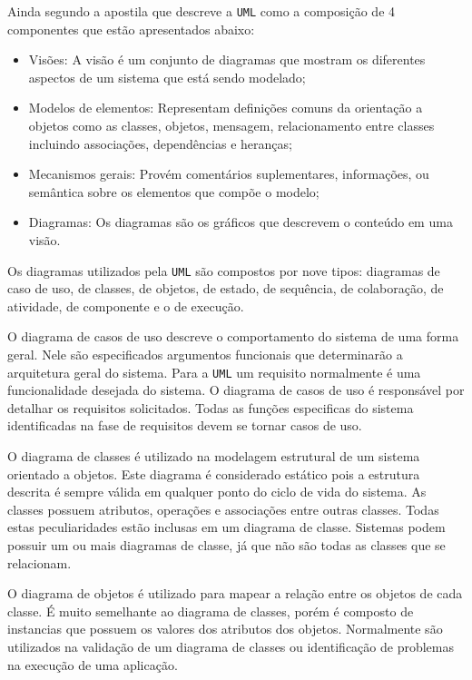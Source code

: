 Ainda segundo a apostila \cite{uml} que descreve a \texttt{UML} como a composição de 4 componentes que estão apresentados abaixo:

\begin{itemize}

	\item Visões: A visão é um conjunto de diagramas que mostram os diferentes aspectos de um sistema que está sendo modelado;
	\item Modelos de elementos: Representam definições comuns da orientação a objetos como as classes, objetos, mensagem, 
	relacionamento entre classes incluindo associações, dependências e heranças;
	\item Mecanismos gerais: Provém comentários suplementares, informações, ou semântica sobre os elementos que compõe o modelo;
	\item Diagramas: Os diagramas são os gráficos que descrevem o conteúdo em uma visão.

\end{itemize}

Os diagramas utilizados pela \texttt{UML} são compostos por nove tipos: diagramas de caso de uso, de classes, de objetos, de estado, de sequência,
de colaboração, de atividade, de componente e o de execução.

O diagrama de casos de uso descreve o comportamento do sistema de uma forma geral. Nele são especificados argumentos funcionais que 
determinarão a arquitetura geral do sistema. Para a \texttt{UML} um requisito normalmente é uma funcionalidade desejada do sistema. 
O diagrama de casos de uso é responsável por detalhar os requisitos solicitados. Todas as funções especificas do sistema identificadas 
na fase de requisitos devem se tornar casos de uso.

O diagrama de classes é utilizado na modelagem estrutural de um sistema orientado a objetos. Este diagrama é considerado estático pois 
a estrutura descrita é sempre válida em qualquer ponto do ciclo de vida do sistema. As classes possuem atributos, operações e associações 
entre outras classes. Todas estas peculiaridades estão inclusas em um diagrama de classe. Sistemas podem possuir um ou mais diagramas de
classe, já que não são todas as classes que se relacionam.

O diagrama de objetos é utilizado para mapear a relação entre os objetos de cada classe. É muito semelhante ao diagrama de classes, 
porém é composto de instancias que possuem os valores dos atributos dos objetos. Normalmente são utilizados na validação de um diagrama 
de classes ou identificação de problemas na execução de uma aplicação.

